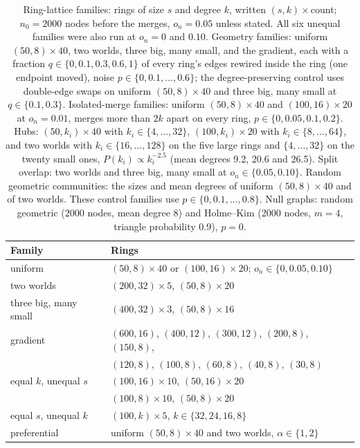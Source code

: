 \begin{table}[tbp]
\caption{Ring-lattice families: rings of size $s$ and degree $k$, written
$(s,k)\times$count; $n_0=2000$ nodes before the merges, $o_n=0.05$ unless stated. All six
unequal families were also run at $o_n=0$ and $0.10$. Geometry families: uniform
$(50,8)\times40$, two worlds, three big, many small, and the gradient, each with a
fraction $q\in\{0,0.1,0.3,0.6,1\}$ of every ring's edges rewired inside the ring (one
endpoint moved), noise $p\in\{0,0.1,\dots,0.6\}$; the degree-preserving control uses
double-edge swaps on uniform $(50,8)\times40$ and three big, many small at
$q\in\{0.1,0.3\}$. Isolated-merge families: uniform $(50,8)\times40$ and
$(100,16)\times20$ at $o_n=0.01$, merges more than $2k$ apart on every ring,
$p\in\{0,0.05,0.1,0.2\}$. Hubs: $(50,k_i)\times40$ with $k_i\in\{4,\dots,32\}$,
$(100,k_i)\times20$ with $k_i\in\{8,\dots,64\}$, and two worlds with $k_i\in\{16,\dots,128\}$
on the five large rings and $\{4,\dots,32\}$ on the twenty small ones, $P(k_i)\propto
k_i^{-2.5}$ (mean degrees 9.2, 20.6 and 26.5). Split overlap: two worlds and three big,
many small at $o_n\in\{0.05,0.10\}$. Random geometric communities: the sizes and mean
degrees of uniform $(50,8)\times40$ and of two worlds. These control families use
$p\in\{0,0.1,\dots,0.8\}$. Null graphs: random geometric (2000 nodes, mean degree 8) and
Holme--Kim (2000 nodes, $m=4$, triangle probability $0.9$), $p=0$.}
\label{tab:shapes}
\begin{ruledtabular}
\begin{tabular}{ll}
Family & Rings \\
\hline
uniform & $(50,8)\times40$ or $(100,16)\times20$; $o_n\in\{0,0.05,0.10\}$ \\
two worlds & $(200,32)\times5$, $(50,8)\times20$ \\
three big, many small & $(400,32)\times3$, $(50,8)\times16$ \\
gradient & $(600,16)$, $(400,12)$, $(300,12)$, $(200,8)$, $(150,8)$, \\
 & $(120,8)$, $(100,8)$, $(60,8)$, $(40,8)$, $(30,8)$ \\
equal $k$, unequal $s$ & $(100,16)\times10$, $(50,16)\times20$ \\
 & $(100,8)\times10$, $(50,8)\times20$ \\
equal $s$, unequal $k$ & $(100,k)\times5$, $k\in\{32,24,16,8\}$ \\
preferential & uniform $(50,8)\times40$ and two worlds, $\alpha\in\{1,2\}$ \\
\end{tabular}
\end{ruledtabular}
\end{table}

